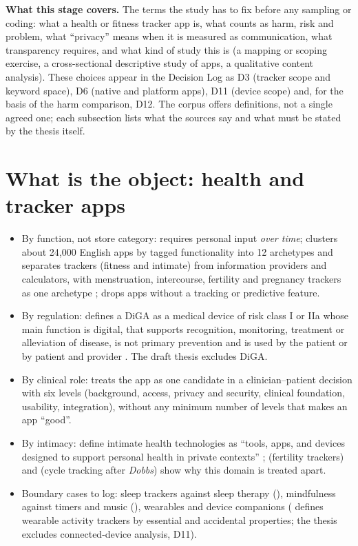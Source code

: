 
\noindent\textbf{What this stage covers.} The terms the study has to fix before any sampling or coding: what a health or fitness tracker app is, what counts as harm, risk and problem, what ``privacy'' means when it is measured as communication, what transparency requires, and what kind of study this is (a mapping or scoping exercise, a cross-sectional descriptive study of apps, a qualitative content analysis). These choices appear in the Decision Log as D3 (tracker scope and keyword space), D6 (native and platform apps), D11 (device scope) and, for the basis of the harm comparison, D12. The corpus offers definitions, not a single agreed one; each subsection lists what the sources say and what must be stated by the thesis itself.

\section{What is the object: health and tracker apps}
\begin{itemize}
\item By function, not store category:  requires personal input \emph{over time};  clusters about 24{,}000 English apps by tagged functionality into 12 archetypes and separates trackers (fitness and intimate) from information providers and calculators, with menstruation, intercourse, fertility and pregnancy trackers as one archetype ;  drops apps without a tracking or predictive feature.
\item By regulation:  defines a DiGA as a medical device of risk class I or IIa whose main function is digital, that supports recognition, monitoring, treatment or alleviation of disease, is not primary prevention and is used by the patient or by patient and provider . The draft thesis excludes DiGA.
\item By clinical role:  treats the app as one candidate in a clinician--patient decision with six levels (background, access, privacy and security, clinical foundation, usability, integration), without any minimum number of levels that makes an app ``good''.
\item By intimacy:  define intimate health technologies as ``tools, apps, and devices designed to support personal health in private contexts'' ;  (fertility trackers) and  (cycle tracking after \emph{Dobbs}) show why this domain is treated apart.
\item Boundary cases to log: sleep trackers against sleep therapy (), mindfulness against timers and music (), wearables and device companions ( defines wearable activity trackers by essential and accidental properties; the thesis excludes connected-device analysis, D11).
\end{itemize}

